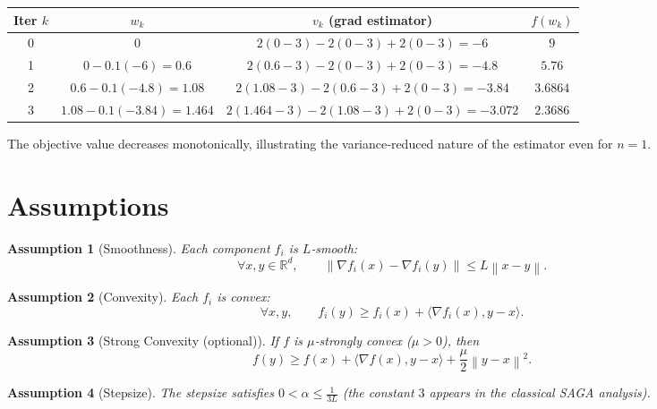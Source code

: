 \documentclass[12pt]{article}
\newtheorem{assumption}{Assumption}
\newcommand{\R}{\mathbb{R}}
\newcommand{\grad}{\nabla}
\newcommand{\norm}[1]{\left\| #1\right\|}
\newcommand{\inner}[2]{\langle #1,#2\rangle}
\begin{document}
\begin{center}
\begin{tabular}{c|c|c|c}
Iter $k$ & $w_k$ & $v_k$ (grad estimator) & $f(w_k)$\\\hline
0 & $0$ & $2(0-3)-2(0-3)+2(0-3)= -6$ & $9$\\
1 & $0-0.1(-6)=0.6$ & $2(0.6-3)-2(0-3)+2(0-3)= -4.8$ & $5.76$\\
2 & $0.6-0.1(-4.8)=1.08$ & $2(1.08-3)-2(0.6-3)+2(0-3)= -3.84$ & $3.6864$\\
3 & $1.08-0.1(-3.84)=1.464$ & $2(1.464-3)-2(1.08-3)+2(0-3)= -3.072$ & $2.3686$
\end{tabular}
\end{center}
The objective value decreases monotonically, illustrating the variance‑reduced nature of the estimator even for $n=1$.

\section*{Assumptions}
\begin{assumption}[Smoothness]\label{ass:smooth}
Each component $f_i$ is $L$‑smooth:
\[
\forall x,y\in\R^{d},\qquad 
\norm{\grad f_i(x)-\grad f_i(y)}\le L\norm{x-y}.
\]
\end{assumption}
\begin{assumption}[Convexity]\label{ass:convex}
Each $f_i$ is convex:
\[
\forall x,y,\qquad 
f_i(y)\ge f_i(x)+\inner{\grad f_i(x)}{y-x}.
\]
\end{assumption}
\begin{assumption}[Strong Convexity (optional)]\label{ass:strong}
If $f$ is $\mu$‑strongly convex ($\mu>0$), then
\[
f(y)\ge f(x)+\inner{\grad f(x)}{y-x}+\frac{\mu}{2}\norm{y-x}^2.
\]
\end{assumption}
\begin{assumption}[Stepsize]\label{ass:stepsize}
The stepsize satisfies $0<\alpha\le \frac{1}{3L}$ (the constant $3$ appears in the classical SAGA analysis).
\end{assumption}
\end{document}
